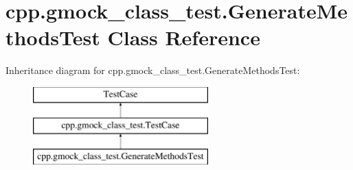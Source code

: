 \hypertarget{classcpp_1_1gmock__class__test_1_1GenerateMethodsTest}{}\section{cpp.\+gmock\+\_\+class\+\_\+test.\+Generate\+Methods\+Test Class Reference}
\label{classcpp_1_1gmock__class__test_1_1GenerateMethodsTest}
Inheritance diagram for cpp.\+gmock\+\_\+class\+\_\+test.\+Generate\+Methods\+Test\+:\begin{figure}[H]
\begin{center}
\leavevmode
\includegraphics[height=3.000000cm]{classcpp_1_1gmock__class__test_1_1GenerateMethodsTest}
\end{center}
\end{figure}
